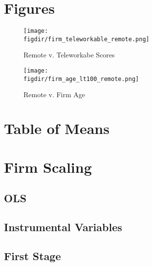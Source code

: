\documentclass{article}
\newcommand{\cleanedresultsdir}{../results/cleaned}
\newcommand{\figdir}{../results/figures}
\begin{document}
\section{Figures}

\begin{figure}[H]
  \centering
  \texttt{[image: \\figdir/firm\_teleworkable\_remote.png]}
  \caption{Remote v. Teleworkabe Scores}
\end{figure}

\begin{figure}[H]
  \centering
  \texttt{[image: \\figdir/firm\_age\_lt100\_remote.png]}
  \caption{Remote v. Firm Age}
\end{figure}


\section{Table of Means}



\clearpage
\section{Firm Scaling}
\label{sec:firm_scaling}

\subsection{OLS}


\subsection{Instrumental Variables}


\subsection{First Stage}

\end{document}
